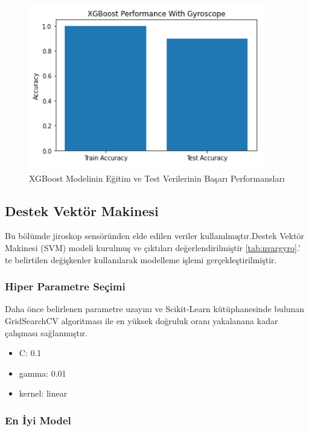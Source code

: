 \documentclass[12pt,twoside]{deuthesis}
\providecommand{\tightlist}{%
  \setlength{\itemsep}{0pt}\setlength{\parskip}{0pt}}
\begin{document}
\begin{figure}

{\centering \includegraphics[width=0.6\linewidth,height=0.25\textheight]{figure/xgboost_testtrain} 

}

\caption{XGBoost Modelinin Eğitim ve Test Verilerinin Başarı Performansları}\label{fig:xgboosttesttrain}
\end{figure}
\hypertarget{destek-vektuxf6r-makinesi-1}{%
\subsection{Destek Vektör Makinesi}\label{destek-vektuxf6r-makinesi-1}}

Bu bölümde jiroskop sensöründen elde edilen veriler kullanılmıştır.Destek Vektör Makinesi (SVM) modeli kurulmuş ve çıktıları değerlendirilmiştir
\ref{tab:nvargyro}.' te belirtilen değişkenler kullanılarak modelleme işlemi gerçekleştirilmiştir.

\hypertarget{hiper-parametre-seuxe7imi-3}{%
\subsubsection{Hiper Parametre Seçimi}\label{hiper-parametre-seuxe7imi-3}}

Daha önce belirlenen parametre uzayını ve Scikit-Learn kütüphanesinde bulunan GridSearchCV algoritması ile en yüksek doğruluk oranı yakalanana kadar çalışması sağlanmıştır.
\begin{itemize}
\tightlist
\item
  C: 0.1
\item
  gamma: 0.01
\item
  kernel: linear
\end{itemize}
\hypertarget{en-iyi-model-3}{%
\subsubsection{En İyi Model}\label{en-iyi-model-3}}
\end{document}
